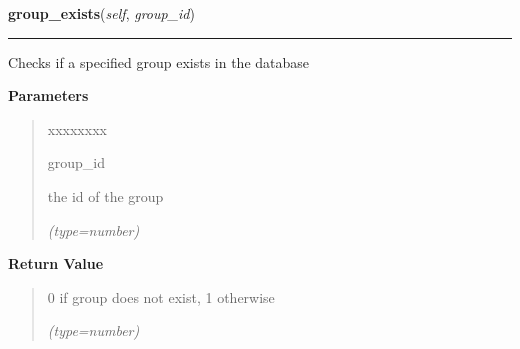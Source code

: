 \hspace{.8\funcindent}\begin{boxedminipage}{\funcwidth}

    \raggedright \textbf{group\_exists}(\textit{self}, \textit{group\_id})

    \vspace{-1.5ex}

    \rule{\textwidth}{0.5\fboxrule}
\setlength{\parskip}{2ex}
    Checks if a specified group exists in the database

\setlength{\parskip}{1ex}
      \textbf{Parameters}
      \vspace{-1ex}

      \begin{quote}
        \begin{Ventry}{xxxxxxxx}

          \item[group\_id]

          the id of the group

            {\it (type=number)}

        \end{Ventry}

      \end{quote}

      \textbf{Return Value}
    \vspace{-1ex}

      \begin{quote}
      0 if group does not exist, 1 otherwise

      {\it (type=number)}

      \end{quote}

    \end{boxedminipage}

    \label{DBE:DBE:check_duplicate_data}

    \vspace{0.5ex}

